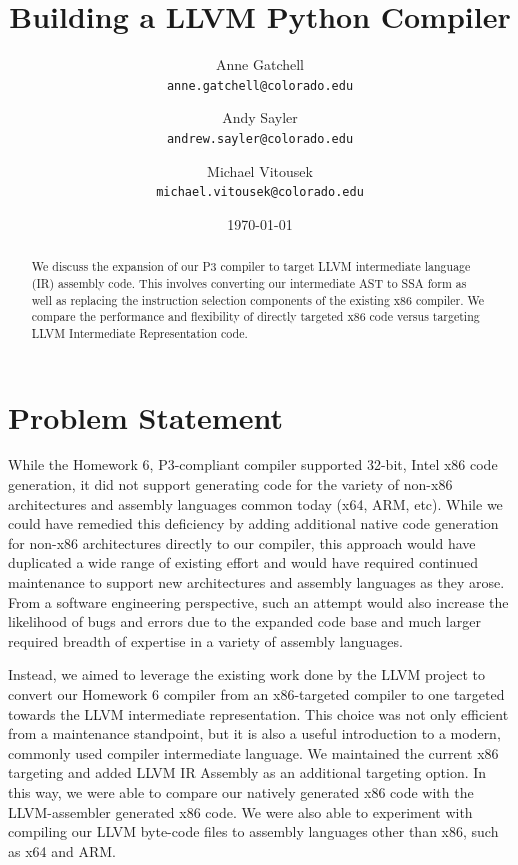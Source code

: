 \documentclass[11pt,twocolumn]{article}
\begin{document}
\title{
  Building a LLVM Python Compiler
}

\author{
  Anne Gatchell    \\ \texttt{anne.gatchell@colorado.edu} \and
  Andy Sayler      \\ \texttt{andrew.sayler@colorado.edu} \and
  Michael Vitousek \\ \texttt{michael.vitousek@colorado.edu}
}

\date{\today}

\maketitle

\begin{abstract}

We discuss the expansion of our P3 compiler to target LLVM
intermediate language (IR) assembly code. This involves converting our
intermediate AST to SSA form as well as replacing the instruction
selection components of the existing x86 compiler. We compare the
performance and flexibility of directly targeted x86 code versus
targeting LLVM Intermediate Representation code.

\end{abstract}

\section{Problem Statement}

While the Homework 6, P3-compliant compiler supported 32-bit, Intel
x86 code generation, it did not support generating code for the
variety of non-x86 architectures and assembly languages common today
(x64, ARM, etc). While we could have remedied this deficiency by
adding additional native code generation for non-x86 architectures
directly to our compiler, this approach would have duplicated a wide
range of existing effort and would have required continued maintenance
to support new architectures and assembly languages as they
arose. From a software engineering perspective, such an attempt would
also increase the likelihood of bugs and errors due to the expanded
code base and much larger required breadth of expertise in a variety
of assembly languages.

Instead, we aimed to leverage the existing work done by the LLVM
project \cite{llvm.org} to convert our Homework 6 compiler from an
x86-targeted compiler to one targeted towards the LLVM intermediate
representation. This choice was not only efficient from a maintenance
standpoint, but it is also a useful introduction to a modern, commonly
used compiler intermediate language. We maintained the current x86
targeting and added LLVM IR Assembly \cite{lattner-llvmlangref} as an
additional targeting option. In this way, we were able to compare our
natively generated x86 code with the LLVM-assembler generated x86
code. We were also able to experiment with compiling our LLVM
byte-code files to assembly languages other than x86, such as x64 and
ARM.
\end{document}
